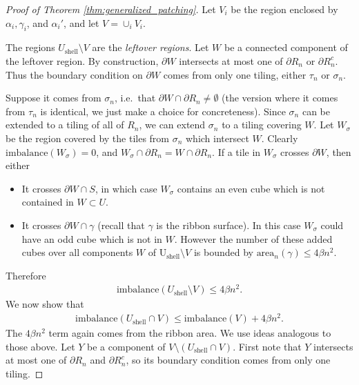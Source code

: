 \documentclass[11pt]{article}
\theoremstyle{remark}
\theoremstyle{definition}
\begin{document}
\begin{proof}[Proof of Theorem \ref{thm:generalized_patching}]
     Let $V_i$ be the region enclosed by $\alpha_i,\gamma_i$, and $\alpha_i'$, and let $V = \cup_i V_i$. 

     The regions $U_{\text{shell}}\setminus V$ are the \textit{leftover regions}. Let $W$ be a connected component of the leftover region. By construction, $\partial W$ intersects at most one of $\partial R_n$ or $\partial R^c_n$. Thus the boundary condition on $\partial W$ comes from only one tiling, either $\tau_n$ or $\sigma_n$. 

     Suppose it comes from $\sigma_n$, i.e.\ that $\partial W\cap \partial R_n\neq \emptyset$ (the version where it comes from $\tau_n$ is identical, we just make a choice for concreteness). Since $\sigma_n$ can be extended to a tiling of all of $R_n$, we can extend $\sigma_n$ to a tiling covering $W$. Let $W_\sigma$ be the region covered by the tiles from $\sigma_n$ which intersect $W$. Clearly $\text{imbalance}(W_\sigma)=0$, and $W_\sigma\cap \partial R_n = W\cap \partial R_n$. If a tile in $W_\sigma$ crosses $\partial W$, then either
     \begin{itemize}
         \item It crosses $\partial W \cap S$, in which case $W_\sigma$ contains an even cube which is not contained in $W\subset U$. 
         \item It crosses $\partial W\cap \gamma$ (recall that $\gamma$ is the ribbon surface). In this case $W_\sigma$ could have an odd cube which is not in $W$. However the number of these added cubes over all components $W$ of $\text{U}_{\text{shell}}\setminus V$ is bounded by $\text{area}_n(\gamma) \leq 4\beta n^2$.
     \end{itemize}
    Therefore 
    \begin{align*}
        \text{imbalance}(U_{\text{shell}}\setminus V) \leq 4 \beta n^2. 
    \end{align*}
    We now show that 
    \begin{align*}
        \text{imbalance}(U_{\text{shell}}\cap V) \leq \text{imbalance}(V) + 4\beta n^2. 
    \end{align*}
    The $4\beta n^2$ term again comes from the ribbon area. We use ideas analogous to those above. Let $Y$ be a component of $V\setminus (U_{\text{shell}}\cap V)$. First note that $Y$ intersects at most one of $\partial R_n$ and $\partial R_n^c$, so its boundary condition comes from only one tiling. 


\end{proof}
\end{document}
